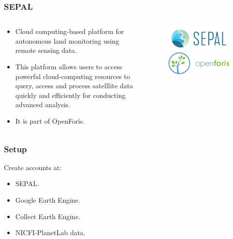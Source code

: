 \documentclass[aspectratio=169]{beamer}
\begin{document}
\begin{frame}
    \frametitle{SEPAL}
    \begin{columns}
        \begin{column}{0.5\textwidth}
            \begin{itemize}
                \item Cloud computing-based platform for autonomous land 
                    monitoring using remote sensing data.
                \item This platform allows users to access powerful 
                    cloud-computing resources to query, access and process 
                    satelllite data quickly and efficiently for conducting 
                    advanced analysis.
                \item It is part of OpenForis.
            \end{itemize}
        \end{column}
        \begin{column}{0.5\textwidth}
            \begin{figure}
                \centering
                \includegraphics[scale=0.4]{logos/sepal.png}
                \includegraphics[scale=0.8]{logos/openforis.png}
            \end{figure}
        \end{column}
    \end{columns}
\end{frame}

\begin{frame}
    \frametitle{Setup}
    Create accounts at:
    \begin{itemize}
        \item SEPAL.
        \item Google Earth Engine.
        \item Collect Earth Engine.
        \item NICFI-PlanetLab data.
    \end{itemize}
\end{frame}
\end{document}
